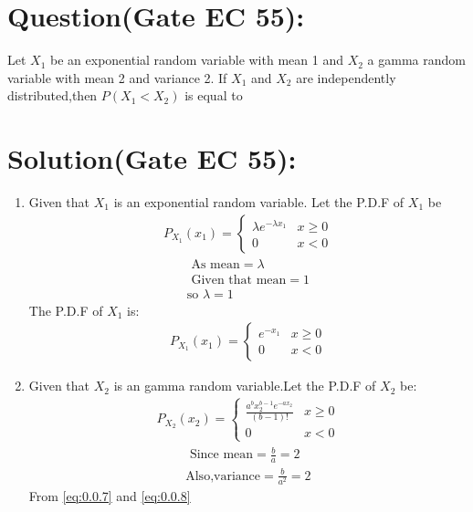 \documentclass[journal,12pt,twocolumn]{IEEEtran}
\begin{document}
\section*{Question(Gate EC 55):}
 Let $X_1$ be an exponential random variable
with mean 1 and $X_2$ a gamma random variable
with mean 2 and variance 2. If $X_1$ and $X_2$ are
independently distributed,then $P(X_1 < X_2)$ is equal to
\section*{Solution(Gate EC 55):}
\begin{enumerate}
    \item Given that $X_1$ is an exponential random variable. Let the P.D.F of $X_1$ be
    \begin{align}
    P_{X_1}(x_1)=
        \begin{cases}
        \lambda e^{-\lambda x_1} & x \geq 0\\
        0 & x<0
        \end{cases}
    \end{align}
    \begin{align}
    \text{ As mean}=\lambda\\
     \text{ Given that mean}=1\\
     \text{so } \lambda=1
    \end{align} 
     The P.D.F of $X_1$ is:
    \begin{align}
       P_{X_1}(x_1)=
        \begin{cases}
        e^{-x_1} & x\geq 0\\
        0 & x<0
        \end{cases}
    \end{align}
    \item Given that $X_2$ is an gamma random variable.Let the P.D.F of $X_2$ be:
    \begin{align}
        P_{X_2}(x_2)=
        \begin{cases}
            \frac{a^b x_2^{b-1}e^{-ax_2}}{(b-1)!} & x\geq 0\\
            0 & x<0
        \end{cases}
    \end{align}
    \begin{align}
       \text{ Since mean}=\frac{b}{a}=2\label{eq:0.0.7}\\
         \text{Also,variance}=\frac{b}{a^2}=2\label{eq:0.0.8}
    \end{align}
  From \eqref{eq:0.0.7} and \eqref{eq:0.0.8}

\end{enumerate}
\end{document}
